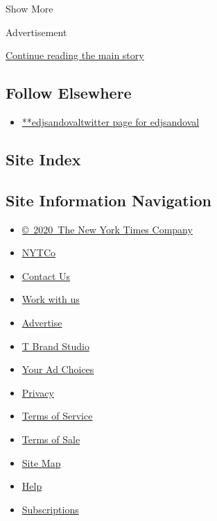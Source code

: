 Show More

Advertisement

\protect\hyperlink{after-mid2}{Continue reading the main story}

\hypertarget{follow-elsewhere}{%
\subsection{Follow Elsewhere}\label{follow-elsewhere}}

\begin{itemize}
\tightlist
\item
  \href{https://twitter.com/edjsandoval}{**edjsandovaltwitter page for
  edjsandoval}
\end{itemize}

\hypertarget{site-index}{%
\subsection{Site Index}\label{site-index}}

\hypertarget{site-information-navigation}{%
\subsection{Site Information
Navigation}\label{site-information-navigation}}

\begin{itemize}
\tightlist
\item
  \href{https://help.nytimes3xbfgragh.onion/hc/en-us/articles/115014792127-Copyright-notice}{©~2020~The
  New York Times Company}
\end{itemize}

\begin{itemize}
\tightlist
\item
  \href{https://www.nytco.com/}{NYTCo}
\item
  \href{https://help.nytimes3xbfgragh.onion/hc/en-us/articles/115015385887-Contact-Us}{Contact
  Us}
\item
  \href{https://www.nytco.com/careers/}{Work with us}
\item
  \href{https://nytmediakit.com/}{Advertise}
\item
  \href{http://www.tbrandstudio.com/}{T Brand Studio}
\item
  \href{https://www.nytimes3xbfgragh.onion/privacy/cookie-policy\#how-do-i-manage-trackers}{Your
  Ad Choices}
\item
  \href{https://www.nytimes3xbfgragh.onion/privacy}{Privacy}
\item
  \href{https://help.nytimes3xbfgragh.onion/hc/en-us/articles/115014893428-Terms-of-service}{Terms
  of Service}
\item
  \href{https://help.nytimes3xbfgragh.onion/hc/en-us/articles/115014893968-Terms-of-sale}{Terms
  of Sale}
\item
  \href{https://spiderbites.nytimes3xbfgragh.onion}{Site Map}
\item
  \href{https://help.nytimes3xbfgragh.onion/hc/en-us}{Help}
\item
  \href{https://www.nytimes3xbfgragh.onion/subscription?campaignId=37WXW}{Subscriptions}
\end{itemize}
